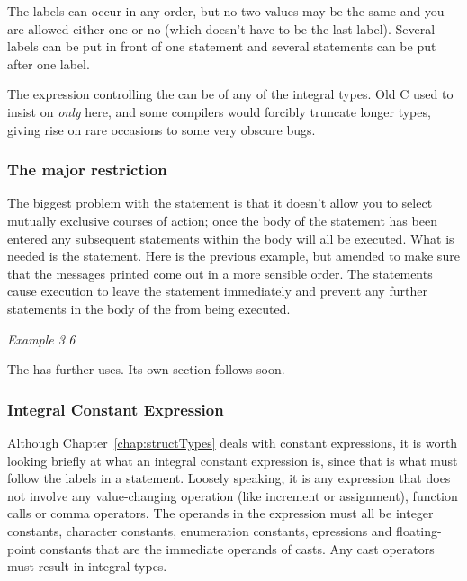    The labels can occur in any order, but no two values may be the same and
    you are allowed either one or no  (which doesn't have
    to be the last label). Several labels can be put in front of one statement
    and several statements can be put after one label.


   The expression controlling the \switch{} can be of any of the
    integral types. Old C used to insist on \textit{only}
    \kint{} here, and some compilers would forcibly truncate longer
    types, giving rise on rare occasions to some very obscure bugs.


   \subsubsection{The major restriction}
    

    The biggest problem with the \switch{} statement is that it
     doesn't allow you to select mutually exclusive courses of action; once
     the body of the statement has been entered any subsequent statements
     within the body will all be executed. What is needed is the
     \kbreak{} statement. Here is the previous example, but amended
     to make sure that the messages printed come out in a more sensible order.
     The \kbreak{} statements cause execution to leave the
     \switch{} statement immediately and prevent any further
     statements in the body of the \switch{} from being
     executed.


    \begin{center}\textit{Example 3.6}\end{center}


    The \kbreak{} has further uses. Its own section follows
     soon.


   

   \subsubsection{Integral Constant Expression}
    

   Although Chapter~\ref{chap:structTypes} deals with constant expressions,
   it is worth looking briefly at what an integral constant expression is,
   since that is what must follow the \case{} labels in a
   \switch{} statement. Loosely speaking, it is any expression
   that does not involve any value-changing operation (like increment or
   assignment), function calls or comma operators. The operands in the
   expression must all be integer constants, character constants,
   enumeration constants, \sizeof{} epressions and floating-point
   constants that are the immediate operands of casts. Any cast operators
   must result in integral types.


